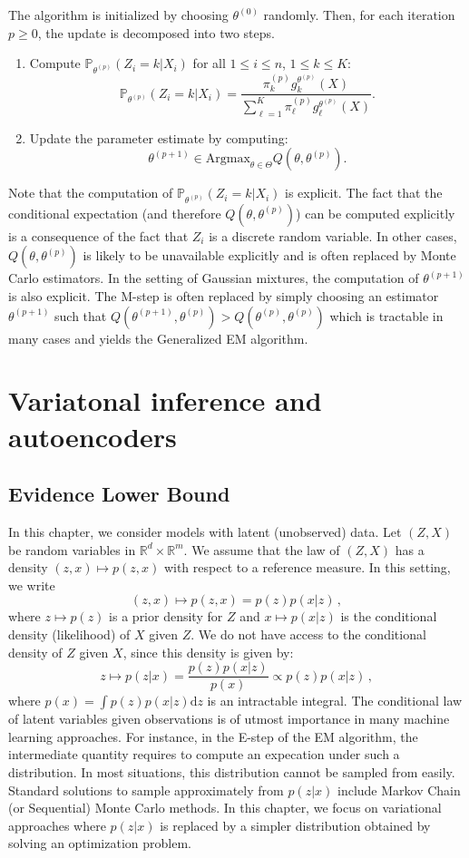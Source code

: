 \documentclass[english,graybox,envcountchap,envcountsame,sectrefs,shortlabels]{svmono}
\theoremstyle{style}
\newcommand{\eqsp}{}
\begin{document}
The algorithm is initialized by choosing $\theta^{(0)}$ randomly. Then, for each iteration $p\geq 0$, the update is decomposed into two steps.
\begin{enumerate}
\item Compute $\mathbb{P}_{\theta^{(p)}}(Z_i = k|X_i)$ for all $1\leq i \leq n$, $1\leq k \leq K$:
$$
\mathbb{P}_{\theta^{(p)}}(Z_i = k|X_i) = \frac{\pi^{(p)}_kg^{\theta^{(p)}}_k(X)}{\sum_{\ell=1}^{K}\pi^{(p)}_\ell g^{\theta^{(p)}}_\ell(X)}\eqsp.
$$
\item Update the parameter estimate by computing:
$$
\theta^{(p+1)} \in \mathrm{Argmax}_{\theta\in\Theta} Q(\theta,\theta^{(p)})\eqsp.
$$
\end{enumerate}
Note that the computation of $\mathbb{P}_{\theta^{(p)}}(Z_i = k|X_i) $ is explicit. The fact that the conditional expectation (and therefore $Q(\theta,\theta^{(p)})$) can be computed explicitly is a consequence of the fact that $Z_i$ is a discrete random variable. In other cases, $Q(\theta,\theta^{(p)})$ is likely to be unavailable explicitly and is often replaced by Monte Carlo estimators. In the setting of Gaussian mixtures, the computation of $\theta^{(p+1)}$ is also explicit. The M-step is often replaced by simply choosing an estimator $\theta^{(p+1)}$ such that $Q(\theta^{(p+1)},\theta^{(p)}) > Q(\theta^{(p)},\theta^{(p)})$  which is tractable in many cases and yields the Generalized EM algorithm.

\chapter{Variatonal inference and autoencoders}


\section{Evidence Lower Bound}
In this chapter, we consider models with latent (unobserved) data. Let $(Z,X)$ be random variables in $\mathbb{R}^d\times \mathbb{R}^m$. We assume that the law of $(Z,X)$ has a density $(z,x)\mapsto p(z,x)$ with respect to a reference measure. In this setting, we write
$$
(z,x)\mapsto p(z,x) = p(z)p(x|z)\,,
$$
where $z\mapsto p(z)$ is a prior density for $Z$ and $x \mapsto p(x|z)$ is the conditional density (likelihood) of $X$ given $Z$. We do not have access to the conditional density of $Z$ given $X$, since this density is given by:
$$
z\mapsto p(z|x) = \frac{p(z)p(x|z)}{p(x)}\propto p(z)p(x|z)\,, 
$$
where $p(x) = \int p(z)p(x|z) \mathrm{d} z$ is an intractable integral. The conditional law of latent variables given observations is of utmost importance in many machine learning approaches. For instance, in the E-step of the EM algorithm, the intermediate quantity requires to compute an expecation under such a distribution. In most situations, this distribution cannot be sampled from easily. Standard solutions to sample approximately from $p(z|x)$ include Markov Chain (or Sequential) Monte Carlo methods. In this chapter, we focus on variational approaches where $p(z|x)$ is replaced by a simpler distribution obtained by solving an optimization problem. 
\end{document}

